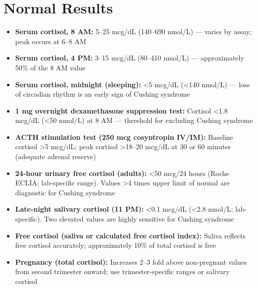\section*{Normal Results}
\begin{itemize}
  \item \textbf{Serum cortisol, 8 AM:} 5--25 mcg/dL (140--690 nmol/L) --- varies by assay; peak occurs at 6--8 AM
  \item \textbf{Serum cortisol, 4 PM:} 3--15 mcg/dL (80--410 nmol/L) --- approximately 50\% of the 8 AM value
  \item \textbf{Serum cortisol, midnight (sleeping):} <5 mcg/dL (<140 nmol/L) --- loss of circadian rhythm is an early sign of Cushing syndrome
  \item \textbf{1 mg overnight dexamethasone suppression test:} Cortisol <1.8 mcg/dL (<50 nmol/L) at 8 AM --- threshold for excluding Cushing syndrome
  \item \textbf{ACTH stimulation test (250 mcg cosyntropin IV/IM):} Baseline cortisol >5 mcg/dL; peak cortisol >18--20 mcg/dL at 30 or 60 minutes (adequate adrenal reserve)
  \item \textbf{24-hour urinary free cortisol (adults):} <50 mcg/24 hours (Roche ECLIA; lab-specific range). Values >4 times upper limit of normal are diagnostic for Cushing syndrome
  \item \textbf{Late-night salivary cortisol (11 PM):} <0.1 mcg/dL (<2.8 nmol/L; lab-specific). Two elevated values are highly sensitive for Cushing syndrome
  \item \textbf{Free cortisol (saliva or calculated free cortisol index):} Saliva reflects free cortisol accurately; approximately 10\% of total cortisol is free
  \item \textbf{Pregnancy (total cortisol):} Increases 2--3 fold above non-pregnant values from second trimester onward; use trimester-specific ranges or salivary cortisol
\end{itemize}

